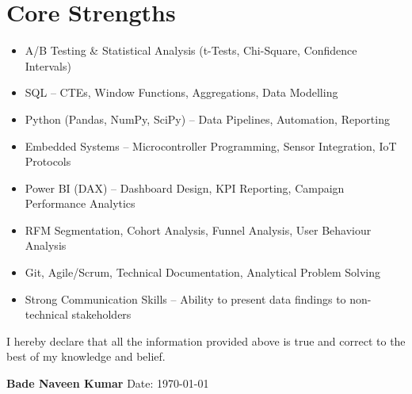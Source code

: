 \documentclass[11pt,a4paper]{article}
\begin{document}
\section{Core Strengths}

\begin{itemize}
  \item A/B Testing \& Statistical Analysis (t-Tests, Chi-Square, Confidence Intervals)
  \item SQL -- CTEs, Window Functions, Aggregations, Data Modelling
  \item Python (Pandas, NumPy, SciPy) -- Data Pipelines, Automation, Reporting
  \item Embedded Systems -- Microcontroller Programming, Sensor Integration, IoT Protocols
  \item Power BI (DAX) -- Dashboard Design, KPI Reporting, Campaign Performance Analytics
  \item RFM Segmentation, Cohort Analysis, Funnel Analysis, User Behaviour Analysis
  \item Git, Agile/Scrum, Technical Documentation, Analytical Problem Solving
  \item Strong Communication Skills -- Ability to present data findings to non-technical stakeholders
\end{itemize}

\vspace{8pt}
\noindent I hereby declare that all the information provided above is true and correct to the best of my knowledge
and belief.

\vspace{6pt}
\noindent\textbf{Bade Naveen Kumar} \hfill Date: \today
\end{document}
